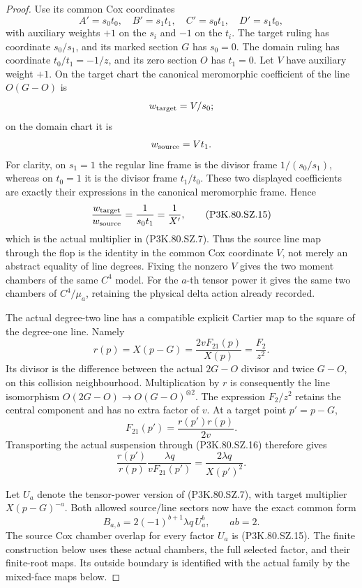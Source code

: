 \begin{proof}
Use its common Cox coordinates
\[
 A'=s_0t_0,\quad B'=s_1t_1,\quad C'=s_0t_1,\quad D'=s_1t_0,
\]
with auxiliary weights \(+1\) on the \(s_i\) and \(-1\) on the
\(t_i\). The target ruling has coordinate \(s_0/s_1\), and its marked
section \(G\) has \(s_0=0\). The domain ruling has coordinate
\(t_0/t_1=-1/z\), and its zero section \(O\) has \(t_1=0\).
Let \(V\) have auxiliary weight \(+1\). On the target chart the
canonical meromorphic coefficient of the line \(O(G-O)\) is
\[
                             w_{\rm target}=V/s_0;
\]
on the domain chart it is
\[
                             w_{\rm source}=Vt_1.
\]
For clarity, on \(s_1=1\) the regular line frame is the divisor
frame \(1/(s_0/s_1)\), whereas on \(t_0=1\) it is the divisor
frame \(t_1/t_0\). These two displayed coefficients are exactly
their expressions in the canonical meromorphic frame. Hence
\[
                 \frac{w_{\rm target}}{w_{\rm source}}
                       =\frac1{s_0t_1}=\frac1{X'},           \tag{P3K.80.SZ.15}
\]
which is the actual multiplier in (P3K.80.SZ.7). Thus the source line map
through the flop is the identity in the common Cox coordinate \(V\),
not merely an abstract equality of line degrees. Fixing the nonzero
\(V\) gives the two moment chambers of the same \(C^4\) model.
For the \(a\)-th tensor power it gives the same two chambers of
\(C^4/\mu_a\), retaining the physical delta action already recorded.

The actual degree-two line has a compatible explicit Cartier map
to the square of the degree-one line. Namely
\[
 r(p)=X(p-G)=\frac{2vF_{21}(p)}{X(p)}
              =\frac{F_2}{z^2}.                            \tag{P3K.80.SZ.16}
\]
Its divisor is the difference between the actual \(2G-O\) divisor
and twice \(G-O\), on this collision neighbourhood. Multiplication
by \(r\) is consequently the line isomorphism
\(O(2G-O)\longrightarrow O(G-O)^{\otimes2}\). The expression
\(F_2/z^2\) retains the central component and has no extra factor of
\(v\). At a target point \(p'=p-G\),
\[
 F_{21}(p')=\frac{r(p')r(p)}{2v}.
\]
Transporting the actual suspension through (P3K.80.SZ.16) therefore gives
\[
 \frac{r(p')}{r(p)}\frac{\lambda q}{vF_{21}(p')}
                         =\frac{2\lambda q}{X(p')^2}.       \tag{P3K.80.SZ.17}
\]

Let \(U_a\) denote the tensor-power version of (P3K.80.SZ.7), with target
multiplier \(X(p-G)^{-a}\). Both allowed source/line sectors now have
the exact common form
\[
           B_{a,b}=2(-1)^{b+1}\lambda q\,U_a^b,
                       \qquad ab=2.                        \tag{P3K.80.SZ.18}
\]
The source Cox chamber overlap for every factor \(U_a\) is (P3K.80.SZ.15).
The finite construction below uses these actual chambers, the full selected factor, and their finite-root maps.
Its outside boundary is identified with the actual family by the mixed-face maps below.


\end{proof}
